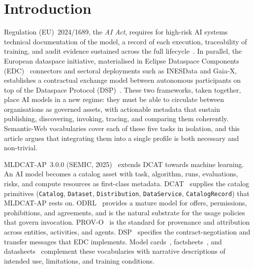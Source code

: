\documentclass[Afour,sagev,times]{sagej}
\newcommand{\code}[1]{\texttt{#1}}
\begin{document}

\maketitle

\section{Introduction}\label{sec:intro}

Regulation (EU)~2024/1689, the \emph{AI Act}, requires for high-risk AI systems technical documentation of the model, a record of each execution, traceability of training, and audit evidence sustained across the full lifecycle~\cite{aiact}. In parallel, the European dataspace initiative, materialised in Eclipse Dataspace Components (EDC)~\cite{edc} connectors and sectoral deployments such as INESData and Gaia-X, establishes a contractual exchange model between autonomous participants on top of the Dataspace Protocol (DSP)~\cite{dsp}. These two frameworks, taken together, place AI models in a new regime: they must be able to circulate between organisations as governed assets, with actionable metadata that sustain publishing, discovering, invoking, tracing, and comparing them coherently. Semantic-Web vocabularies cover each of these five tasks in isolation, and this article argues that integrating them into a single profile is both necessary and non-trivial.

MLDCAT-AP~3.0.0 (SEMIC, 2025)~\cite{mldcatap} extends DCAT towards machine learning. An AI model becomes a catalog asset with task, algorithm, runs, evaluations, risks, and compute resources as first-class metadata. DCAT~\cite{dcat2} supplies the catalog primitives (\code{Catalog}, \code{Dataset}, \code{Distribution}, \code{DataService}, \code{CatalogRecord}) that MLDCAT-AP rests on. ODRL~\cite{odrl22} provides a mature model for offers, permissions, prohibitions, and agreements, and is the natural substrate for the usage policies that govern invocation. PROV-O~\cite{provo} is the standard for provenance and attribution across entities, activities, and agents. DSP~\cite{dsp} specifies the contract-negotiation and transfer messages that EDC implements. Model cards~\cite{mitchell19}, factsheets~\cite{arnold19}, and datasheets~\cite{gebru21} complement these vocabularies with narrative descriptions of intended use, limitations, and training conditions.
\end{document}
